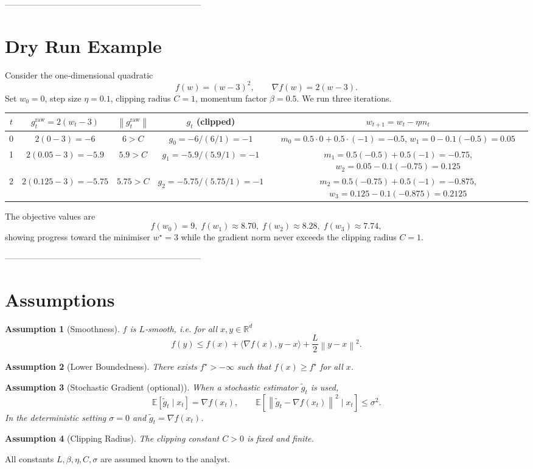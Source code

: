 \documentclass{article}
\newtheorem{assumption}{Assumption}
\newcommand{\E}{\mathbb{E}}
\newcommand{\R}{\mathbb{R}}
\newcommand{\norm}[1]{\left\lVert#1\right\rVert}
\begin{document}
---------------------------------------------------------------------

\section*{Dry Run Example}
Consider the one‑dimensional quadratic
\[
f(w)=(w-3)^{2},\qquad \nabla f(w)=2(w-3).
\]
Set $w_{0}=0$, step size $\eta=0.1$, clipping radius $C=1$, momentum factor $\beta=0.5$.
We run three iterations.

\begin{center}
\begin{tabular}{c|c|c|c|c}
$t$ & $g^{\text{raw}}_{t}=2(w_{t}-3)$ & $\norm{g^{\text{raw}}_{t}}$ & $g_{t}$ (clipped) & $w_{t+1}=w_{t}-\eta m_{t}$\\\hline
0 & $2(0-3)=-6$ & $6>C$ & $g_{0}= -6/ (6/1)= -1$ & $m_{0}=0.5\cdot0+0.5\cdot(-1)=-0.5$, $w_{1}=0-0.1(-0.5)=0.05$\\
1 & $2(0.05-3)=-5.9$ & $5.9>C$ & $g_{1}= -5.9/ (5.9/1)= -1$ & $m_{1}=0.5(-0.5)+0.5(-1)=-0.75$, $w_{2}=0.05-0.1(-0.75)=0.125$\\
2 & $2(0.125-3)=-5.75$ & $5.75>C$ & $g_{2}= -5.75/ (5.75/1)= -1$ & $m_{2}=0.5(-0.75)+0.5(-1)=-0.875$, $w_{3}=0.125-0.1(-0.875)=0.2125$
\end{tabular}
\end{center}
The objective values are
\[
f(w_{0})=9,\; f(w_{1})\approx 8.70,\; f(w_{2})\approx 8.28,\; f(w_{3})\approx 7.74,
\]
showing progress toward the minimiser $w^{\star}=3$ while the gradient norm never exceeds the clipping radius $C=1$.

---------------------------------------------------------------------

\section*{Assumptions}
\begin{assumption}[Smoothness]\label{as:smooth}
$f$ is $L$‑smooth, i.e. for all $x,y\in\R^{d}$
\[
f(y)\le f(x)+\langle\nabla f(x),y-x\rangle+\frac{L}{2}\norm{y-x}^{2}.
\]
\end{assumption}
\begin{assumption}[Lower Boundedness]\label{as:bound}
There exists $f^{\star}>-\infty$ such that $f(x)\ge f^{\star}$ for all $x$.
\end{assumption}
\begin{assumption}[Stochastic Gradient (optional)]\label{as:stoch}
When a stochastic estimator $\tilde g_{t}$ is used,
\[
\E[\tilde g_{t}\mid x_{t}]=\nabla f(x_{t}),\qquad
\E[\norm{\tilde g_{t}-\nabla f(x_{t})}^{2}\mid x_{t}]\le\sigma^{2}.
\]
In the deterministic setting $\sigma=0$ and $\tilde g_{t}= \nabla f(x_{t})$.
\end{assumption}
\begin{assumption}[Clipping Radius]\label{as:clip}
The clipping constant $C>0$ is fixed and finite.
\end{assumption}
All constants $L,\beta,\eta,C,\sigma$ are assumed known to the analyst.
\end{document}
